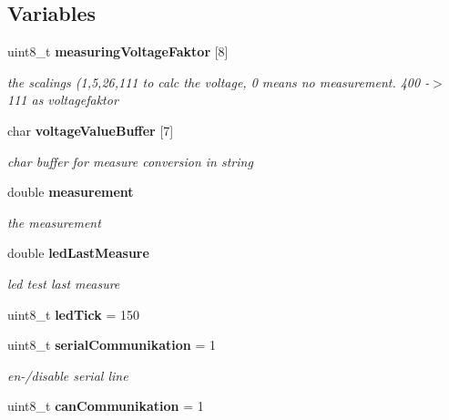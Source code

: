 \subsection*{\-Variables}
\begin{DoxyCompactItemize}
\item 
uint8\-\_\-t {\bf measuring\-Voltage\-Faktor} [8]\label{group__main_gaeca23ad01b13484c7312b200ed6784f5}

\begin{DoxyCompactList}\small\item\em the scalings (1,5,26,111 to calc the voltage, 0 means no measurement. 400 -\/$>$ 111 as voltagefaktor \end{DoxyCompactList}\item 
char {\bf voltage\-Value\-Buffer} [7]\label{group__main_gae5aef890ef31321222ea054aa00125bf}

\begin{DoxyCompactList}\small\item\em char buffer for measure conversion in string \end{DoxyCompactList}\item 
double {\bf measurement}\label{group__main_ga62e8e90e87e4843689cf8ddcf8aa8644}

\begin{DoxyCompactList}\small\item\em the measurement \end{DoxyCompactList}\item 
double {\bf led\-Last\-Measure}\label{group__main_gab340f4007d4f592c05d26af52abdd76a}

\begin{DoxyCompactList}\small\item\em led test last measure \end{DoxyCompactList}\item 
uint8\-\_\-t {\bfseries led\-Tick} = 150\label{group__main_ga4087d222fc7fd5618b4ef683f759e4dd}

\item 
uint8\-\_\-t {\bf serial\-Communikation} = 1\label{group__main_gac183334870c7d6b315d6eab9a63d36d2}

\begin{DoxyCompactList}\small\item\em en-\//disable serial line \end{DoxyCompactList}\item 
uint8\-\_\-t {\bf can\-Communikation} = 1\label{group__main_ga7931e0891699e412246d057cb3a3ec6d}


\end{DoxyCompactItemize}
